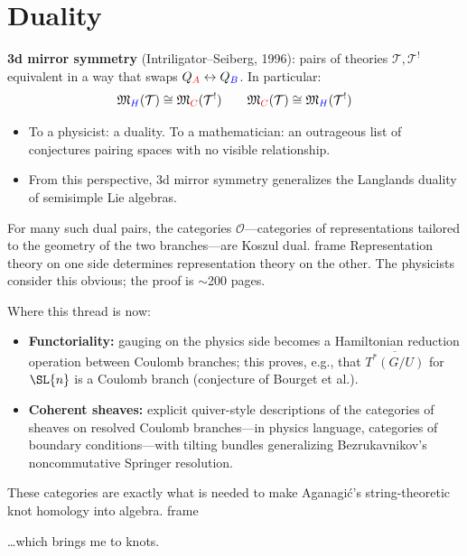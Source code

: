 \documentclass[presentation]{beamer}
\newenvironment{block}
\newenvironment{frame}
\theoremstyle{remark}
\begin{document}
\section{Duality}
\begin{frame}
  {\bf 3d mirror symmetry} (Intriligator--Seiberg, 1996): pairs of
  theories $\mathcal{T},\mathcal{T}^!$ equivalent in a way that swaps
  $Q_{\color{red} A}\leftrightarrow Q_{\color{blue} B}$.  In
  particular:
  \[\mathfrak{M}_{\color{blue}H}(\mathcal{T})\cong \mathfrak{M}_{\color{red}C}(\mathcal{T}^!)\qquad
    \mathfrak{M}_{\color{red}C}(\mathcal{T})\cong \mathfrak{M}_{\color{blue}H}(\mathcal{T}^!)\]
  \begin{itemize}
  \item To a physicist: a duality.  To a mathematician: an outrageous
    list of conjectures pairing spaces with no visible relationship.
  \item From this perspective, 3d mirror symmetry generalizes the
    Langlands duality of semisimple Lie algebras.
  \end{itemize}
  \begin{block}{Theorem (Braden--Licata--Proudfoot--W.)}
    For many such dual pairs, the categories $\mathcal{O}$---categories of
    representations tailored to the geometry of the two
    branches---are Koszul dual.
  \end{block}
  Representation theory on one side determines representation theory
  on the other.  The physicists consider this obvious; the proof is
  $\sim$200 pages.
\end{frame}

\begin{frame}
  Where this thread is now:
  \begin{itemize}
  \item {\bf Functoriality:} gauging on the physics side becomes a
    Hamiltonian reduction operation between Coulomb branches; this
    proves, e.g., that $\overline{T^*(G/U)}$ for $\SL{n}$ is a Coulomb
    branch (conjecture of Bourget et al.).
  \item {\bf Coherent sheaves:} explicit quiver-style descriptions of
    the categories of sheaves on resolved Coulomb branches---in
    physics language, categories of boundary conditions---with
    tilting bundles generalizing Bezrukavnikov's noncommutative
    Springer resolution.
  \end{itemize}
  \begin{block}{}
    These categories are exactly what is needed to make Aganagi\'c's
    string-theoretic knot homology into algebra.
  \end{block}
  \centerline{\ldots which brings me to knots.}
\end{frame}
\end{document}
